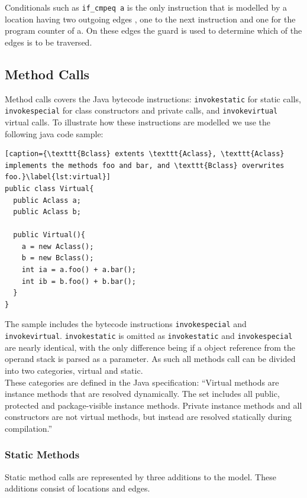 Conditionals such as \texttt{if\_cmpeq a} is the only instruction that is modelled by a location having two outgoing edges , one to the next instruction and one for the program counter of a. On these edges the guard is used to determine which of the edges is to be traversed. 

\subsection{Method Calls}\label{subsubsec:method}
Method calls covers the Java bytecode instructions: \texttt{invokestatic} for static calls, \texttt{invokespecial} for class constructors and private calls, and \texttt{invokevirtual} virtual calls. To illustrate how these instructions are modelled we use the following java code sample:
\begin{lstlisting}[caption={\texttt{Bclass} extents \texttt{Aclass}, \texttt{Aclass} implements the methods foo and bar, and \texttt{Bclass} overwrites foo.}\label{lst:virtual}]
public class Virtual{
  public Aclass a;
  public Aclass b;

  public Virtual(){
    a = new Aclass();
    b = new Bclass();
    int ia = a.foo() + a.bar();
    int ib = b.foo() + b.bar();
  }
}
\end{lstlisting}
The sample includes the bytecode instructions \texttt{invokespecial} and \texttt{invokevirtual}.
\texttt{invokestatic} is omitted as \texttt{invokestatic} and \texttt{invokespecial} are nearly identical, with the only difference being if a object reference from the operand stack is parsed as a parameter.
As such all methods call can be divided into two categories, virtual and static.  \\

These categories are defined in the Java specification: ``Virtual methods are instance methods that are resolved dynamically. The set includes all public, protected and package-visible instance methods. Private instance methods and all constructors are not virtual methods, but instead are resolved statically during compilation.'' \cite[chap. 4.3.7.6]{java_card_spec}

\subsubsection{Static Methods}
Static method calls are represented by three additions to the model. These additions consist of locations and edges.\\ 


